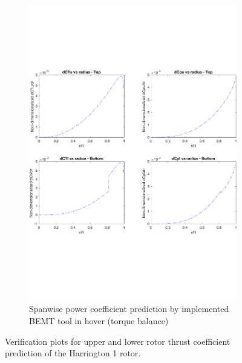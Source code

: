 \begin{figure}[H]
\begin{subfigure}[t]{0.5\textwidth}
    \includegraphics[width=\textwidth]{Figures/CT_plot.pdf}
    \caption{Spanwise power coefficient prediction by implemented BEMT tool in hover (torque balance)}
    \label{fig:disks}
\end{subfigure}
    \captionsetup{justification=centering}
    \caption{Verification plots for upper and lower rotor thrust coefficient prediction of the Harrington 1 rotor.}
    \label{fig:BEMT}
\end{figure}

